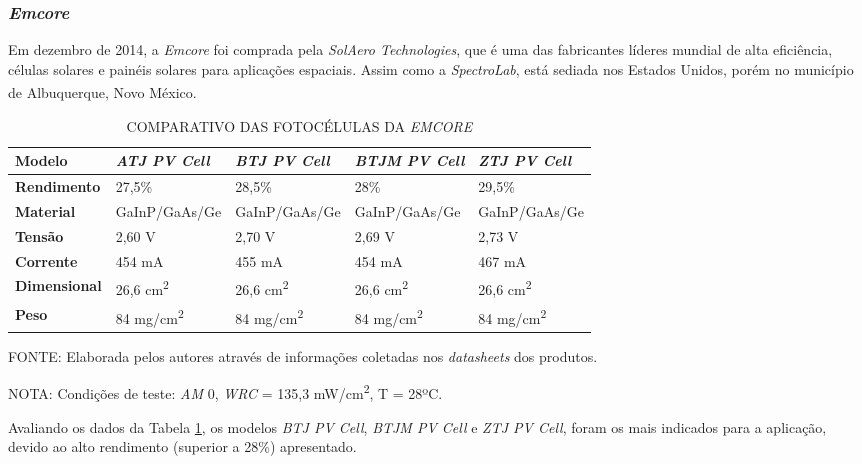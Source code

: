\documentclass[
	12pt,				%
	openright,			%
	oneside,			%
	a4paper,			%
	english,			%
	french,				%
	spanish,			%
	brazil,				%
	oldfontcommands
	]{abntex2}
\begin{document}
\subsubsection[Emcore]{\textit{Emcore}}

	Em dezembro de 2014, a \textit{Emcore} foi comprada pela \textit{SolAero Technologies}, que é uma das fabricantes líderes mundial de alta eficiência, células solares e painéis solares para aplicações espaciais. Assim como a \textit{SpectroLab}, está sediada nos Estados Unidos, porém no município de Albuquerque, Novo México.\textsuperscript{\cite{Emcore}}\textsuperscript{\cite{Emcore2}}
	
	\begin{table}[th]
	\caption{COMPARATIVO DAS FOTOCÉLULAS DA \textit{EMCORE}}
	\label{Tab_Emcore_Comp}
	\begin{tabular}{p{2.5cm}|p{3.1cm}|p{3.1cm}|p{3.1cm}|p{3.1cm}}
		\textbf{Modelo} & \textit{\textbf{ATJ PV Cell}} & \textit{\textbf{BTJ PV Cell}} & \textit{\textbf{BTJM PV Cell}} & \textit{\textbf{ZTJ PV Cell}} \\
		\hline
		\textbf{Rendimento} & 27,5\% & 28,5\% & 28\% & 29,5\% \\
		\hline
		\textbf{Material} & GaInP/GaAs/Ge & GaInP/GaAs/Ge & GaInP/GaAs/Ge & GaInP/GaAs/Ge\\
		\hline
		\textbf{Tensão} & 2,60 V & 2,70 V & 2,69 V & 2,73 V\\
		\hline
		\textbf{Corrente} & 454 mA & 455 mA & 454 mA & 467 mA\\
		\hline
		\textbf{Dimensional} & 26,6 cm\textsuperscript{2} & 26,6 cm\textsuperscript{2} & 26,6 cm\textsuperscript{2} & 26,6 cm\textsuperscript{2}\\
		\hline
		\textbf{Peso} & 84 mg/cm\textsuperscript{2} & 84 mg/cm\textsuperscript{2} & 84 mg/cm\textsuperscript{2} & 84 mg/cm\textsuperscript{2}\\
	\end{tabular}
	
	\begin{small}
	\vspace{3pt}
		FONTE: Elaborada pelos autores através de informações coletadas nos \textit{datasheets} dos produtos.
	\end{small}
	\begin{footnotesize}
		NOTA: Condições de teste: \textit{AM} 0, \textit{WRC} = 135,3 mW/cm\textsuperscript{2}, T = 28ºC.
	\end{footnotesize}
	\end{table}
	\pagebreak
	Avaliando os dados da Tabela \ref{Tab_Emcore_Comp}, os modelos \textit{BTJ PV Cell}, \textit{BTJM PV Cell} e \textit{ZTJ PV Cell}, foram os mais indicados para a aplicação, devido ao alto rendimento (superior a 28\%) apresentado.
	
\end{document}
